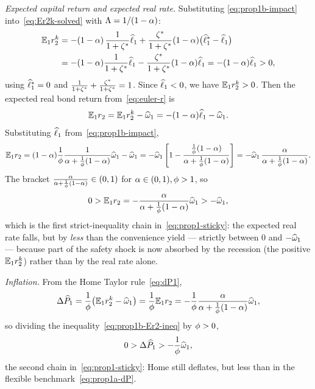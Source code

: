 \emph{Expected capital return and expected real rate.} Substituting
\eqref{eq:prop1b-impact} into~\eqref{eq:Er2k-solved} with
$\Lambda=1/(1-\alpha)$:
\begin{align}
\mathbb{E}_1r^{k}_2 &= -(1-\alpha)\,\frac{1}{1+\zeta^{*}}\widehat{\ell}_1
+\frac{\zeta^{*}}{1+\zeta^{*}}(1-\alpha)\bigl(\widehat{\ell}^{*}_1-\widehat{\ell}_1\bigr) \notag\\
&= -(1-\alpha)\frac{1}{1+\zeta^{*}}\widehat{\ell}_1 - \frac{\zeta^{*}}{1+\zeta^{*}}(1-\alpha)\widehat{\ell}_1
= -(1-\alpha)\widehat{\ell}_1 > 0, \label{eq:prop1b-Erk}
\end{align}
using $\widehat{\ell}^{*}_1=0$ and
$\frac{1}{1+\zeta^{*}}+\frac{\zeta^{*}}{1+\zeta^{*}}=1$. Since $\widehat{\ell}_1<0$, we have
$\mathbb{E}_1r^{k}_2>0$. Then the expected real bond return from~\eqref{eq:euler-r} is
\begin{equation}
\mathbb{E}_1r_2 = \mathbb{E}_1r^{k}_2 - \widehat{\omega}_1 = -(1-\alpha)\widehat{\ell}_1 - \widehat{\omega}_1. \label{eq:prop1b-Er2}
\end{equation}
Substituting $\widehat{\ell}_1$ from~\eqref{eq:prop1b-impact},
\[
\mathbb{E}_1r_2 = (1-\alpha)\frac{1}{\phi}\frac{1}{\alpha+\frac{1}{\phi}(1-\alpha)}\widehat{\omega}_1 - \widehat{\omega}_1
= -\widehat{\omega}_1\left[1 - \frac{\frac{1}{\phi}(1-\alpha)}{\alpha+\frac{1}{\phi}(1-\alpha)}\right]
= -\widehat{\omega}_1\,\frac{\alpha}{\alpha+\frac{1}{\phi}(1-\alpha)}.
\]
The bracket $\frac{\alpha}{\alpha+\frac{1}{\phi}(1-\alpha)}\in(0,1)$ for
$\alpha\in(0,1),\phi>1$, so
\begin{equation}
0 > \mathbb{E}_1r_2 = -\frac{\alpha}{\alpha+\frac{1}{\phi}(1-\alpha)}\widehat{\omega}_1 > -\widehat{\omega}_1, \label{eq:prop1b-Er2-ineq}
\end{equation}
which is the first strict-inequality chain in~\eqref{eq:prop1-sticky}: the
expected real rate falls, but by \emph{less} than the convenience yield ---
strictly between $0$ and $-\widehat{\omega}_1$ --- because part of the safety shock is
now absorbed by the recession (the positive $\mathbb{E}_1r^{k}_2$) rather than by the real
rate alone.

\emph{Inflation.} From the Home Taylor rule~\eqref{eq:dP1},
\begin{equation}
\Delta\widehat{P}_1 = \frac{1}{\phi}\bigl(\mathbb{E}_1r^{k}_2-\widehat{\omega}_1\bigr) = \frac{1}{\phi}\mathbb{E}_1r_2
= -\frac{1}{\phi}\frac{\alpha}{\alpha+\frac{1}{\phi}(1-\alpha)}\widehat{\omega}_1, \label{eq:prop1b-dP}
\end{equation}
so dividing the inequality~\eqref{eq:prop1b-Er2-ineq} by $\phi>0$,
\[
0 > \Delta\widehat{P}_1 > -\frac{1}{\phi}\widehat{\omega}_1,
\]
the second chain in~\eqref{eq:prop1-sticky}: Home still deflates, but less than in
the flexible benchmark~\eqref{eq:prop1a-dP}.

